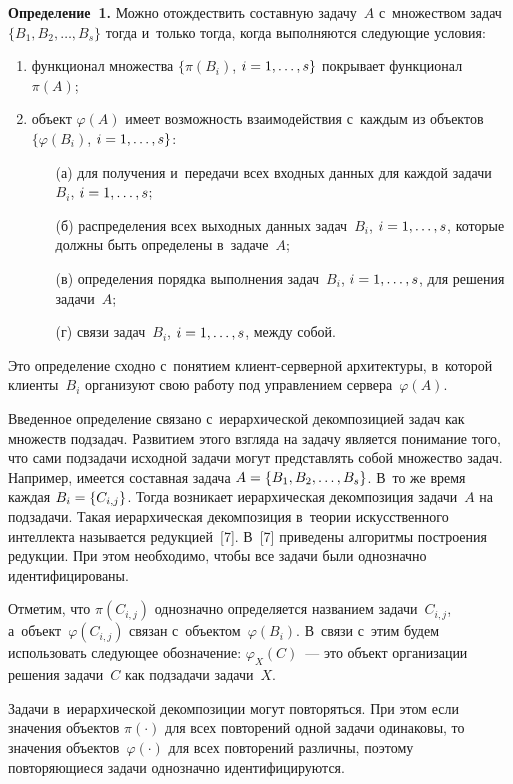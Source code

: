 \begin{multicols}{2}
  \noindent
  \textbf{Определение~1.} Можно отож\-де\-ст\-вить со\-став\-ную задачу~$A$ 
с~множеством задач $\{B_1, B_2,\ldots , B_s\}$ тогда и~только тогда, когда 
выполняются сле\-ду\-ющие условия:
  \begin{enumerate}[(1)]
\item функционал множества $\{\pi (B_i)$, $i\hm= 1,\ldots , s\}$ покрывает 
функционал~$\pi (A)$;
\item объект $\varphi(A)$ имеет воз\-мож\-ность взаимодействия с~каждым из 
объектов $\{\varphi (B_i)$, $i\hm=1,\ldots , s\}$:
\begin{itemize}
\item[(а)] для получения и~передачи всех вход\-ных данных для каж\-дой 
задачи~$B_i$, $i\hm= 1,\ldots , s$;
\item[(б)]распределения всех выходных данных задач~$B_i$, $i\hm= 1,\ldots , s$, 
которые должны быть определены в~задаче~$A$;
\item[(в)]определения порядка выполнения задач~$B_i$, $i\hm= 1,\ldots , s$, для 
решения задачи~$A$;
\item[(г)]связи задач~$B_i$, $i\hm = 1,\ldots, s$, меж\-ду собой. 
\end{itemize}
\end{enumerate}
  
  Это определение сходно с~понятием кли\-ент-сер\-вер\-ной архитектуры, 
в~которой клиенты~$B_i$ организуют свою работу под управ\-ле\-ни\-ем 
сервера~$\varphi(A)$.
  
  Введенное определение связано с~иерархической декомпозицией задач как 
множеств подзадач. Развитием этого взгляда на задачу является понимание того, 
что сами подзадачи исходной задачи могут пред\-став\-лять собой множество задач. 
Например, имеется составная задача $A\hm = \{ B_1, B_2, \ldots ,B_s\}$. В~то же 
время каждая $B_i\hm=\{C_{i,j}\}$. Тогда возникает иерархическая декомпозиция 
задачи~$A$ на подзадачи. Такая иерархическая декомпозиция в~тео\-рии 
искусственного интеллекта называется редукцией~[7]. В~[7] приведены 
алгоритмы по\-стро\-ения редукции. При этом необходимо, чтобы все задачи были 
однозначно идентифицированы. 
  
  Отметим, что $\pi(C_{i,j})$ од\-но\-знач\-но определяется на\-зва\-ни\-ем 
задачи~$C_{i,j}$, а~объект~$\varphi(C_{i,j})$ связан с~объектом~$\varphi(B_i)$. 
В~связи с~этим будем использовать сле\-ду\-ющее обо\-зна\-че\-ние: $\varphi_X(C)$~--- 
это объект организации решения задачи~$C$ как подзадачи задачи~$X$. 
  
  Задачи в~иерархической декомпозиции могут повторяться. При этом если 
значения объектов $\pi(\cdot)$ для всех повторений одной задачи одинаковы, то 
значения объектов~$\varphi(\cdot)$ для всех по\-вто\-ре\-ний различны, поэтому 
по\-вто\-ря\-ющи\-еся задачи однозначно идентифицируются. 
  

\end{multicols}
